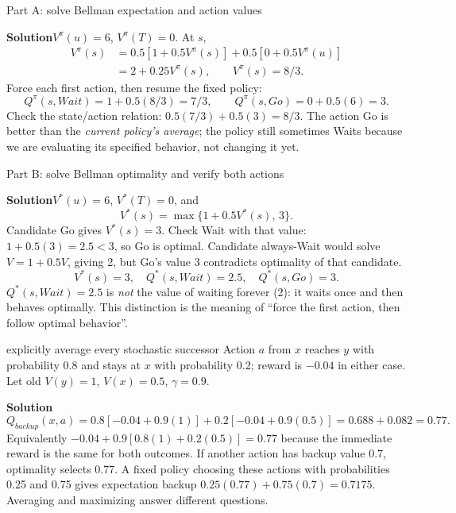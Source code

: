 \documentclass[10pt,a4paper]{article}
\newcommand{\ans}{\par\smallskip\textbf{\color{good}Solution\quad}}
\begin{document}
\begin{question}{Part A: solve Bellman expectation and action values}
\ans $V^\pi(u)=6$, $V^\pi(T)=0$. At $s$,
\[
\begin{aligned}
V^\pi(s)&=0.5[1+0.5V^\pi(s)]+0.5[0+0.5V^\pi(u)]\\
&=2+0.25V^\pi(s),\qquad \boxed{V^\pi(s)=8/3}.
\end{aligned}
\]
Force each first action, then resume the fixed policy:
\[
Q^\pi(s,Wait)=1+0.5(8/3)=7/3,\qquad
Q^\pi(s,Go)=0+0.5(6)=3.
\]
Check the state/action relation: $0.5(7/3)+0.5(3)=8/3$. The action Go is better than the \emph{current policy's average}; the policy still sometimes Waits because we are evaluating its specified behavior, not changing it yet.
\end{question}

\begin{question}{Part B: solve Bellman optimality and verify both actions}
\ans $V^*(u)=6$, $V^*(T)=0$, and
\[
V^*(s)=\max\{1+0.5V^*(s),\,3\}.
\]
Candidate Go gives $V^*(s)=3$. Check Wait with that value: $1+0.5(3)=2.5<3$, so Go is optimal. Candidate always-Wait would solve $V=1+0.5V$, giving 2, but Go's value 3 contradicts optimality of that candidate.
\[
\boxed{V^*(s)=3,\quad Q^*(s,Wait)=2.5,\quad Q^*(s,Go)=3.}
\]
$Q^*(s,Wait)=2.5$ is \emph{not} the value of waiting forever (2): it waits once and then behaves optimally. This distinction is the meaning of ``force the first action, then follow optimal behavior''.
\end{question}

\begin{question}{explicitly average every stochastic successor}
Action $a$ from $x$ reaches $y$ with probability 0.8 and stays at $x$ with probability 0.2; reward is $-0.04$ in either case. Let old $V(y)=1$, $V(x)=0.5$, $\gamma=0.9$.
\ans
\[
Q_{backup}(x,a)=0.8[-0.04+0.9(1)]+0.2[-0.04+0.9(0.5)]
=0.688+0.082=0.77.
\]
Equivalently $-0.04+0.9[0.8(1)+0.2(0.5)]=0.77$ because the immediate reward is the same for both outcomes. If another action has backup value 0.7, optimality selects 0.77. A fixed policy choosing these actions with probabilities 0.25 and 0.75 gives expectation backup $0.25(0.77)+0.75(0.7)=0.7175$. Averaging and maximizing answer different questions.
\end{question}
\end{document}
